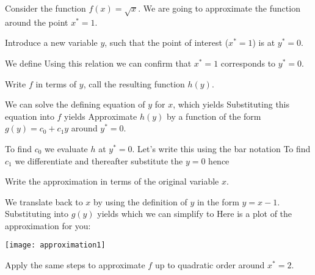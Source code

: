 Consider the function $f(x)=\sqrt{x}$. We are going to approximate the function around the point $x^*=1$.

\subquestion
Introduce a new variable $y$, such that the point of interest ($x^*=1$) is at $y^*=0$. 

\solution 
We define 
Using this relation we can confirm that $x^*=1$ corresponds to $y^*=0$.

\subquestion
Write $f$ in terms of $y$, call the resulting function $h(y)$.

\solution 
We can solve the defining equation of $y$ for $x$, which yields
Substituting this equation into $f$ yields 
\subquestion
Approximate $h(y)$ by a function of the form $g(y)=c_0+c_1y$ around $y^*=0$.

\solution
To find $c_0$ we evaluate $h$ at $y^*=0$. Let's write this using the bar notation 
To find $c_1$ we differentiate and thereafter substitute the $y=0$
hence

\subquestion
Write the approximation in terms of the original variable $x$.

\solution
We translate back to $x$ by using the definition of $y$ in the form $y=x-1$. Substituting into $g(y)$ yields 
which we can simplify to 
Here is a plot of the approximation for you:
\begin{center}
    \texttt{[image: approximation1]}
\end{center}

\subquestion Apply the same steps to approximate $f$ up to quadratic order around $x^*=2$.

